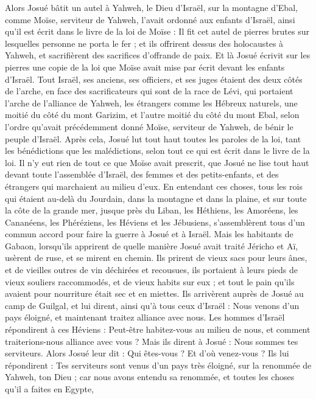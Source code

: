 \begin{multicols}{2}
Alors Josué bâtit un autel à Yahweh, le Dieu d’Israël, sur la montagne d’Ebal,
comme Moïse, serviteur de Yahweh, l’avait ordonné aux enfants d’Israël, ainsi qu’il est écrit dans le livre de la loi de Moïse : Il fit cet autel de pierres brutes sur lesquelles personne ne porta le fer\FTNT{} ; et ils offrirent dessus des holocaustes à Yahweh, et sacrifièrent des sacrifices d’offrande de paix.
Et là Josué écrivit sur les pierres une copie de la loi que Moïse avait mise par écrit devant les enfants d’Israël.
Tout Israël, ses anciens, ses officiers, et ses juges étaient des deux côtés de l’arche, en face des sacrificateurs qui sont de la race de Lévi, qui portaient l’arche de l’alliance de Yahweh, les étrangers comme les Hébreux naturels, une moitié du côté du mont Garizim\FTNT{}, et l’autre moitié du côté du mont Ebal, selon l’ordre qu’avait précédemment donné Moïse, serviteur de Yahweh, de bénir le peuple d’Israël.
Après cela, Josué lut tout haut toutes les paroles de la loi, tant les bénédictions que les malédictions, selon tout ce qui est écrit dans le livre de la loi.
Il n’y eut rien de tout ce que Moïse avait prescrit, que Josué ne lise tout haut devant toute l’assemblée d’Israël, des femmes et des petits-enfants, et des étrangers qui marchaient au milieu d’eux.
\VerseOne{}En entendant ces choses, tous les rois qui étaient au-delà du Jourdain, dans la montagne et dans la plaine, et sur toute la côte de la grande mer, jusque près du Liban, les Héthiens, les Amoréens, les Cananéens, les Phéréziens, les Héviens et les Jébusiens,
s’assemblèrent tous d’un commun accord pour faire la guerre à Josué et à Israël.
Mais les habitants de Gabaon\FTNT{}, lorsqu’ils apprirent de quelle manière Josué avait traité Jéricho et Aï,
usèrent de ruse, et se mirent en chemin. Ils prirent de vieux sacs pour leurs ânes, et de vieilles outres de vin déchirées et recousues,
ils portaient à leurs pieds de vieux souliers raccommodés, et de vieux habits sur eux ; et tout le pain qu’ils avaient pour nourriture était sec et en miettes.
Ils arrivèrent auprès de Josué au camp de Guilgal, et lui dirent, ainsi qu’à tous ceux d’Israël : Nous venons d’un pays éloigné, et maintenant traitez alliance avec nous.
Les hommes d’Israël répondirent à ces Héviens : Peut-être habitez-vous au milieu de nous, et comment traiterions-nous alliance avec vous ?
Mais ils dirent à Josué : Nous sommes tes serviteurs. Alors Josué leur dit : Qui êtes-vous ? Et d’où venez-vous ?
Ils lui répondirent : Tes serviteurs sont venus d’un pays très éloigné, sur la renommée de Yahweh, ton Dieu ; car nous avons entendu sa renommée, et toutes les choses qu’il a faites en Egypte,

\end{multicols}
